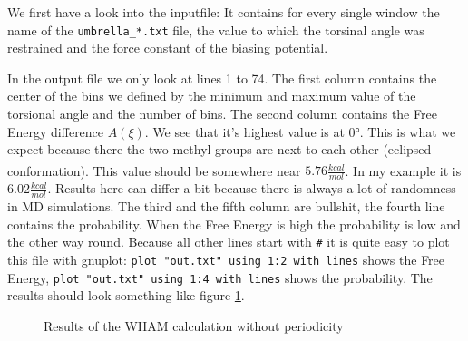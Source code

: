\documentclass[a4paper,11pt]{scrartcl}
\newcommand{\myCite}[1]{\textsuperscript{\cite{#1}}}
\begin{document}
We first have a look into the inputfile: It contains for every single window the name of the \texttt{umbrella\_*.txt} file, the value to which the torsinal angle was restrained and the force constant of the biasing potential.

In the output file we only look at lines 1 to 74. The first column contains the center of the bins we defined by the minimum and maximum value of the torsional angle and the number of bins. The second column contains the Free Energy difference $A(\xi)$. We see that it's highest value is at 0°. This is what we expect because there the two methyl groups are next to each other (eclipsed conformation). This value should be somewhere near $5.76 \frac{kcal}{mol}$\myCite{becker_development_2015}. In my example it is $6.02 \frac{kcal}{mol}$. Results here can differ a bit because there is always a lot of randomness in MD simulations. The third and the fifth column are bullshit, the fourth line contains the probability. When the Free Energy is high the probability is low and the other way round. Because all other lines start with \texttt{\#} it is quite easy to plot this file with gnuplot: \texttt{plot "out.txt" using 1:2 with lines} shows the Free Energy, \texttt{plot "out.txt" using 1:4 with lines} shows the probability. The results should look something like figure \ref{fig:wham_result}.

\begin{figure} [htb]
	\caption{Results of the WHAM calculation without periodicity}
	\label{fig:wham_result}
\end{figure} 
\end{document}
